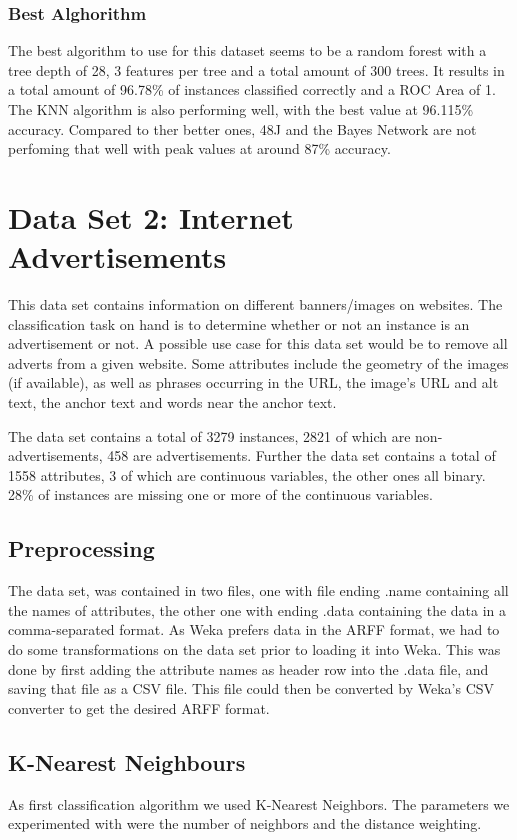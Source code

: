\documentclass{article}
\begin{document}
\subsubsection{Best Alghorithm}
The best algorithm to use for this dataset seems to be a random forest with a tree depth of 28, 3 features per tree and a total amount of 300 trees. It results in a total amount of 96.78\% of instances classified correctly and a ROC Area of 1. The KNN algorithm is also performing well, with the best value at 96.115\% accuracy. Compared to ther better ones, 48J and the Bayes Network are not perfoming that well with peak values at around 87\% accuracy. 


\section{Data Set 2: Internet Advertisements}
This data set contains information on different banners/images on websites. The classification task on hand is to determine whether or not an instance is an advertisement or not. A possible use case for this data set would be to remove all adverts from a given website. Some attributes include the geometry of the images (if available), as well as phrases occurring in the URL, the image's URL and alt text, the anchor text and words near the anchor text.

The data set contains a total of 3279 instances, 2821 of which are non-advertisements, 458 are advertisements. Further the data set contains a total of 1558 attributes, 3 of which are continuous variables, the other ones all binary. 28\% of instances are missing one or more of the continuous variables.


\subsection{Preprocessing}
The data set, was contained in two files, one with file ending .name containing all the names of attributes, the other one with ending .data containing the data in a comma-separated format. As Weka prefers data in the ARFF format, we had to do some transformations on the data set prior to loading it into Weka. This was done by first adding the attribute names as header row into the .data file, and saving that file as a CSV file. This file could then be converted by Weka's CSV converter to get the desired ARFF format.

\subsection{K-Nearest Neighbours}
As first classification algorithm we used K-Nearest Neighbors. The parameters we experimented with were the number of neighbors and the distance weighting.
\end{document}
